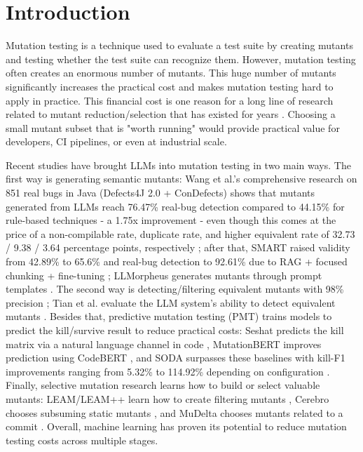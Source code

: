 \section{Introduction}
\label{sec:intro}
Mutation testing is a technique used to evaluate a test suite by creating mutants and testing whether the test suite can recognize them. However, mutation testing often creates an enormous number of mutants. This huge number of mutants significantly increases the practical cost and makes mutation testing hard to apply in practice. This financial cost is one reason for a long line of research related to mutant reduction/selection that has existed for years \cite{guizzo2022sentinel, zhang2019empirical, ojdanic2023evolving}. Choosing a small mutant subset that is "worth running" would provide practical value for developers, CI pipelines, or even at industrial scale.

Recent studies have brought LLMs into mutation testing in two main ways. The first way is generating semantic mutants: Wang et al.'s comprehensive research on 851 real bugs in Java (Defects4J 2.0 + ConDefects) shows that mutants generated from LLMs reach 76.47\% real-bug detection compared to 44.15\% for rule-based techniques - a 1.75x improvement - even though this comes at the price of a non-compilable rate, duplicate rate, and higher equivalent rate of 32.73 / 9.38 / 3.64 percentage points, respectively \cite{wang2025comprehensive}; after that, SMART raised validity from 42.89\% to 65.6\% and real-bug detection to 92.61\% due to RAG + focused chunking + fine-tuning \cite{wang2026smart}; LLMorpheus generates mutants through prompt templates \cite{tip2025llmorpheus}. The second way is detecting/filtering equivalent mutants with 98\% precision \cite{tanhaei2025gemllm}; Tian et al. evaluate the LLM system's ability to detect equivalent mutants \cite{tian2024equivalent}. Besides that, predictive mutation testing (PMT) trains models to predict the kill/survive result to reduce practical costs: Seshat predicts the kill matrix via a natural language channel in code \cite{kim2022seshat}, MutationBERT improves prediction using CodeBERT \cite{jain2023mutationbert}, and SODA surpasses these baselines with kill-F1 improvements ranging from 5.32\% to 114.92\% depending on configuration \cite{zhao2024soda}. Finally, selective mutation research learns how to build or select valuable mutants: LEAM/LEAM++ learn how to create filtering mutants \cite{tian2022leam, tian2025leamplusplus}, Cerebro chooses subsuming static mutants \cite{garg2023cerebro}, and MuDelta chooses mutants related to a commit \cite{ma2021mudelta}. Overall, machine learning has proven its potential to reduce mutation testing costs across multiple stages.

